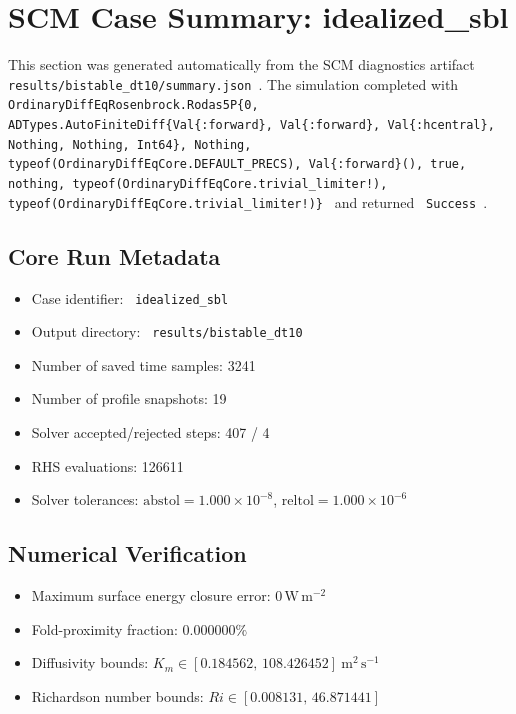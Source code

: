 \section{SCM Case Summary: idealized\_sbl}
\label{sec:scm_case_bistable_dt10_scm_case_report}

This section was generated automatically from the SCM diagnostics artifact
\texttt{ results/bistable\_dt10/summary.json }. The simulation completed with \texttt{ OrdinaryDiffEqRosenbrock.Rodas5P\{0, ADTypes.AutoFiniteDiff\{Val\{:forward\}, Val\{:forward\}, Val\{:hcentral\}, Nothing, Nothing, Int64\}, Nothing, typeof(OrdinaryDiffEqCore.DEFAULT\_PRECS), Val\{:forward\}(), true, nothing, typeof(OrdinaryDiffEqCore.trivial\_limiter!), typeof(OrdinaryDiffEqCore.trivial\_limiter!)\} }
and returned \texttt{ Success }.

\subsection{Core Run Metadata}
\begin{itemize}
  \item Case identifier: \texttt{ idealized\_sbl }
  \item Output directory: \texttt{ results/bistable\_dt10 }
  \item Number of saved time samples: 3241
  \item Number of profile snapshots: 19
  \item Solver accepted/rejected steps: 407 / 4
  \item RHS evaluations: 126611
  \item Solver tolerances: $\mathrm{abstol}=1.000 \times 10^{-8}$, $\mathrm{reltol}=1.000 \times 10^{-6}$
\end{itemize}

\subsection{Numerical Verification}
\begin{itemize}
  \item Maximum surface energy closure error:
  $0\,\mathrm{W\,m^{-2}}$
  \item Fold-proximity fraction:
  $0.000000\%$
  \item Diffusivity bounds:
  $K_m \in [0.184562,\,108.426452]~\mathrm{m^2\,s^{-1}}$
  \item Richardson number bounds:
  $Ri \in [0.008131,\,46.871441]$
\end{itemize}

